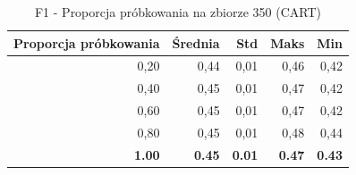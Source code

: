 \begin{table}[htbp]
\centering
\small
\setlength{\tabcolsep}{6pt}
\renewcommand{\arraystretch}{1.2}
\caption{F1 - Proporcja próbkowania na zbiorze 350 (CART)}
\label{tab:CART_sample_ratio_350_f1}
\begin{tabular}{r|r|r|r|r}
\toprule
Proporcja próbkowania & Średnia & Std & Maks & Min \\
\hline
0,20 & 0,44 & 0,01 & 0,46 & 0,42 \\
0,40 & 0,45 & 0,01 & 0,47 & 0,42 \\
0,60 & 0,45 & 0,01 & 0,47 & 0,42 \\
0,80 & 0,45 & 0,01 & 0,48 & 0,44 \\
\textbf{1.00} & \textbf{0.45} & \textbf{0.01} & \textbf{0.47} & \textbf{0.43} \\
\bottomrule
\end{tabular}
\end{table}